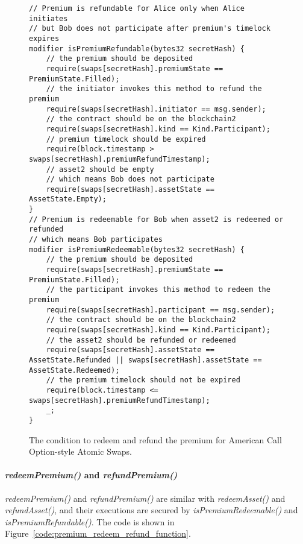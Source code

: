 \begin{figure}
\begin{lstlisting}[language=Solidity, basicstyle=\tiny]
// Premium is refundable for Alice only when Alice initiates
// but Bob does not participate after premium's timelock expires
modifier isPremiumRefundable(bytes32 secretHash) {
    // the premium should be deposited
    require(swaps[secretHash].premiumState == PremiumState.Filled);
    // the initiator invokes this method to refund the premium
    require(swaps[secretHash].initiator == msg.sender);
    // the contract should be on the blockchain2
    require(swaps[secretHash].kind == Kind.Participant);
    // premium timelock should be expired
    require(block.timestamp > swaps[secretHash].premiumRefundTimestamp);
    // asset2 should be empty
    // which means Bob does not participate
    require(swaps[secretHash].assetState == AssetState.Empty);
}
// Premium is redeemable for Bob when asset2 is redeemed or refunded
// which means Bob participates
modifier isPremiumRedeemable(bytes32 secretHash) {
    // the premium should be deposited
    require(swaps[secretHash].premiumState == PremiumState.Filled);
    // the participant invokes this method to redeem the premium
    require(swaps[secretHash].participant == msg.sender);
    // the contract should be on the blockchain2
    require(swaps[secretHash].kind == Kind.Participant);
    // the asset2 should be refunded or redeemed
    require(swaps[secretHash].assetState == AssetState.Refunded || swaps[secretHash].assetState == AssetState.Redeemed);
    // the premium timelock should not be expired
    require(block.timestamp <= swaps[secretHash].premiumRefundTimestamp);
    _;
}
\end{lstlisting}
\label{code:premium_condition_options}
\caption{The condition to redeem and refund the premium for American Call Option-style Atomic Swaps.}
\end{figure}



\paragraph{\textit{redeemPremium()} and \textit{refundPremium()}}

\textit{redeemPremium()} and \textit{refundPremium()} are similar with \textit{redeemAsset()} and \textit{refundAsset()}, and their executions are secured by \textit{isPremiumRedeemable()} and \textit{isPremiumRefundable()}.
The code is shown in Figure~\ref{code:premium_redeem_refund_function}.

